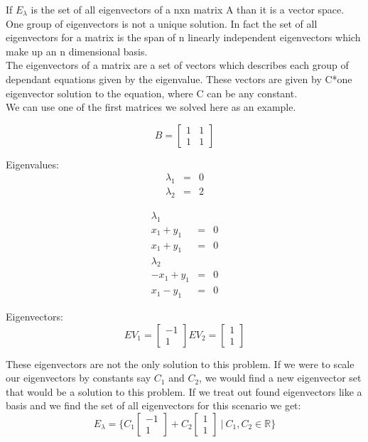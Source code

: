 \documentclass[12pt]{article}
\begin{document}
If $E_{\lambda}$ is the set of all eigenvectors of a nxn matrix A than it is a vector space. One group of eigenvectors is not a unique solution. In fact the set of all eigenvectors for a matrix is the span of n linearly independent eigenvectors which make up an n dimensional basis.\\

The eigenvectors of a matrix are a set of  vectors which describes each group of dependant equations given by the eigenvalue. These vectors are given by C*one eigenvector solution to the equation, where C can be any constant.\\

We can use one of the first matrices we solved here as an example.

\[
B = 
\begin{bmatrix}
1 & 1\\
1 & 1
\end{bmatrix}
\]

Eigenvalues:
\begin{eqnarray*}
\lambda_1 &=& 0\\
\lambda_2 &=& 2 
\end{eqnarray*}

\begin{eqnarray*}
\lambda_1\\
x_1 + y_1 &=& 0\\
x_1 + y_1 &=& 0\\
\lambda_2\\
-x_1 + y_1 &=& 0\\
x_1 - y_1 &=& 0
\end{eqnarray*}

Eigenvectors:
\[
EV_1 =
\begin{bmatrix}
-1\\
1
\end{bmatrix}
EV_2 =
\begin{bmatrix}
1\\
1
\end{bmatrix}
\]

These eigenvectors are not the only solution to this problem. If we were to scale our eigenvectors by constants say $C_1$ and $C_2$, we would find a new eigenvector set that would be a solution to this problem. If we treat out found eigenvectors like a basis and we find the set of all eigenvectors for this scenario we get:
\[
E_{\lambda} = 
\{ 
C_1
\begin{bmatrix}
-1\\
1
\end{bmatrix}
+
C_2
\begin{bmatrix}
1\\
1
\end{bmatrix}
\ |\ 
C_1 , C_2 \in \mathbb{R}
\}
\]
\end{document}
